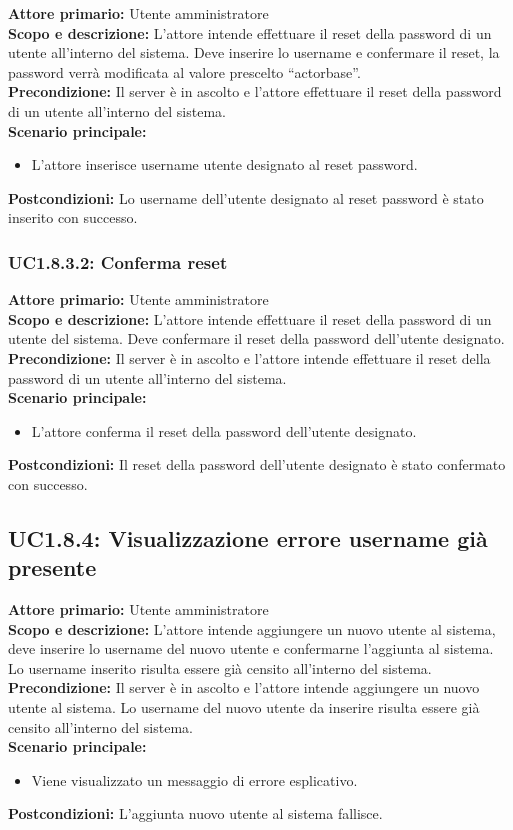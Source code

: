 \documentclass{scalatekids-article}
\begin{document}
\textbf{Attore primario:} Utente amministratore\\
\textbf{Scopo e descrizione:} L'attore intende effettuare il reset della password di un utente all'interno del sistema. Deve inserire lo username e confermare il reset, la password
verrà modificata al valore prescelto ``actorbase''.\\
\textbf{Precondizione:} Il server è in ascolto e l'attore effettuare il reset della password di un utente all'interno del sistema.\\
\textbf{Scenario principale:}
\begin{itemize}
\item L'attore inserisce username utente designato al reset password.
\end{itemize}
\textbf{Postcondizioni:} Lo username dell'utente designato al reset password è stato inserito con successo.

\subsubsection{UC1.8.3.2: Conferma reset}

\textbf{Attore primario:} Utente amministratore\\
\textbf{Scopo e descrizione:} L'attore intende effettuare il reset della password di un utente del sistema. Deve confermare il reset della password dell'utente designato.\\
\textbf{Precondizione:} Il server è in ascolto e l'attore intende effettuare il reset della password di un utente all'interno del sistema.\\
\textbf{Scenario principale:}
\begin{itemize}
\item L'attore conferma il reset della password dell'utente designato.
\end{itemize}
\textbf{Postcondizioni:} Il reset della password dell'utente designato è stato confermato con successo.

\subsection{UC1.8.4: Visualizzazione errore username già presente}

\textbf{Attore primario:} Utente amministratore\\
\textbf{Scopo e descrizione:} L'attore intende aggiungere un nuovo utente al sistema, deve inserire lo username del nuovo utente e confermarne l'aggiunta al sistema.
Lo username inserito risulta essere già censito all'interno del sistema.\\
\textbf{Precondizione:} Il server è in ascolto e l'attore intende aggiungere un nuovo utente al sistema. Lo username del nuovo utente da inserire risulta essere già censito all'interno del sistema.\\
\textbf{Scenario principale:}
\begin{itemize}
\item Viene visualizzato un messaggio di errore esplicativo.
\end{itemize}
\textbf{Postcondizioni:} L'aggiunta nuovo utente al sistema fallisce.
\end{document}
